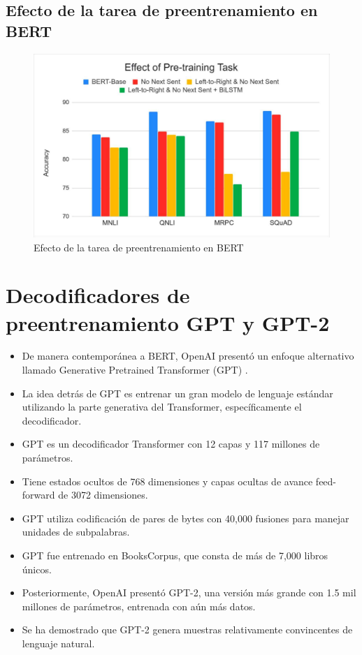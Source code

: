 \subsection{Efecto de la tarea de preentrenamiento en BERT}

\begin{figure}[h]
  \centering
  \includegraphics[scale=0.2]{pics/BERTeffect.png}
  \caption{Efecto de la tarea de preentrenamiento en BERT}
\end{figure}

\section{Decodificadores de preentrenamiento GPT y GPT-2}

\begin{itemize}
\item De manera contemporánea a BERT, OpenAI presentó un enfoque alternativo llamado Generative Pretrained Transformer (GPT) \cite{radford2018improving}.
\item La idea detrás de GPT es entrenar un gran modelo de lenguaje estándar utilizando la parte generativa del Transformer, específicamente el decodificador.
\item GPT es un decodificador Transformer con 12 capas y 117 millones de parámetros.
\item Tiene estados ocultos de 768 dimensiones y capas ocultas de avance feed-forward de 3072 dimensiones.
\item GPT utiliza codificación de pares de bytes con 40,000 fusiones para manejar unidades de subpalabras.
\item GPT fue entrenado en BooksCorpus, que consta de más de 7,000 libros únicos.
\item Posteriormente, OpenAI presentó GPT-2, una versión más grande con 1.5 mil millones de parámetros, entrenada con aún más datos.
\item Se ha demostrado que GPT-2 genera muestras relativamente convincentes de lenguaje natural.
\end{itemize}

